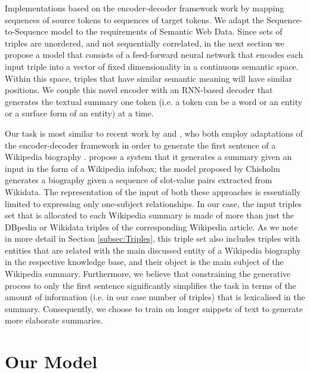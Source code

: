 \documentclass[preprint,5p]{elsarticle}
\begin{document}
Implementations based on the encoder-decoder framework work by mapping sequences of source tokens to sequences of target tokens. We adapt the Se\-quence-to-Se\-quence model to the requirements of Semantic Web Data. Since sets of triples are unordered, and not sequentially correlated, in the next section we propose a model that consists of a feed-forward neural network that encodes each input triple into a vector of fixed dimensionality in a continuous semantic space. Within this space, triples that have similar semantic meaning will have similar positions. We couple this novel encoder with an RNN-based decoder that generates the textual summary one token (i.e. a token can be a word or an entity or a surface form of an entity) at a time.


Our task is most similar to recent work by \citeauthor{Lebret2016} and \citeauthor{Chisholm2017}, who both employ adaptations of the encoder-decoder framework in order to generate the first sentence of a Wikipedia biography \cite{Lebret2016,Chisholm2017}. \citeauthor{Lebret2016} propose a system that it generates a summary given an input in the form of a Wikipedia infobox; the model proposed by Chisholm generates a biography given a sequence of slot-value pairs extracted from Wikidata. The representation of the input of both these approaches is essentially limited to expressing only one-subject relationships. In our case, the input triples set that is allocated to each Wikipedia summary is made of more than just the DBpedia or Wikidata triples of the corresponding Wikipedia article. As we note in more detail in Section \ref{subsec:Triples}, this triple set also includes triples with entities that are related with the main discussed entity of a Wikipedia biography in the respective knowledge base, and their object is the main subject of the Wikipedia summary. Furthermore, we believe that constraining the generative process to only the first sentence significantly simplifies the task in terms of the amount of information (i.e. in our case number of triples) that is lexicalised in the summary. Consequently, we choose to train on longer snippets of text to generate more elaborate summaries.




\section{Our Model}
\label{sec:Model}
\end{document}
